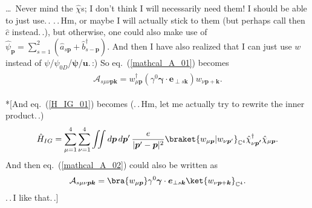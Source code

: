 \documentclass{report}
\begin{document}

\ldots\ Never mind the $\hat \chi$s; I don't think I will necessarily need them! I should be able to just use.\,. .\,.\,Hm, or maybe I will actually stick to them (but perhaps call then $\hat c$ instead.\,.), but otherwise, one could also make use of $\hat \psi_{\boldsymbol{p}} =\sum_{s=1}^2 (\hat a_{s \boldsymbol{p}} + \hat b^\dagger_{s -\boldsymbol{p}})$. And then I have also realized that I can just use $w$ instead of $\psi$/$\psi_{0 D}$/$\boldsymbol\psi$/$\boldsymbol u$.\,:) So eq.\ (\ref{mathcal_A_01}) becomes
\begin{align}
\begin{aligned}
	\mathcal{A}_{s \mu \nu \boldsymbol{p} \boldsymbol{k}} = 
		w_{\mu \boldsymbol{p}}^\dagger
		(\gamma^0 \boldsymbol\gamma \cdot \boldsymbol{e}_{\perp s \boldsymbol{k}})
		w_{\nu \boldsymbol{p} + \boldsymbol{k}}.
	\label{mathcal_A_02}
\end{aligned}
\end{align}

*[And eq.\ (\ref{H_IG_01}) becomes (.\,.\,Hm, let me actually try to rewrite the inner product.\,.)
\begin{align}
\begin{aligned}
	\hat H_{I G} = \sum_{\mu=1}^4\sum_{\nu=1}^4 \iint d\boldsymbol{p}\, d\boldsymbol{p}'\, 
		\frac{e}{|\boldsymbol{p}' - \boldsymbol{p}|^2} 
		\braket{w_{\mu \boldsymbol{p}} | w_{\nu \boldsymbol{p}'}}_{\mathbb{C}^4}
		\hat \chi^\dagger_{\nu \boldsymbol{p'}} \hat \chi_{\mu \boldsymbol{p}}.
	\label{H_IG_02}
\end{aligned}
\end{align}
And then eq.\ (\ref{mathcal_A_02}) could also be written as
\begin{align}
\begin{aligned}
	\mathcal{A}_{s \mu \nu \boldsymbol{p} \boldsymbol{k}} = 
		\bra{w_{\mu \boldsymbol{p}}}
		\gamma^0 \boldsymbol\gamma \cdot \boldsymbol{e}_{\perp s \boldsymbol{k}}
		\ket{w_{\nu \boldsymbol{p} + \boldsymbol{k}}}_{\mathbb{C}^4}.
	\label{mathcal_A_03}
\end{aligned}
\end{align}
.\,.\,I like that.\,.]
\end{document}
